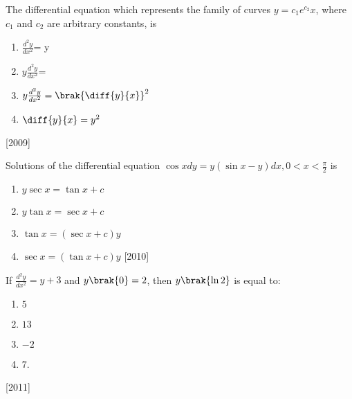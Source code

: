 \item The differential equation which represents the family of curves $y= c{_1}e^{c_2}x$, where $c{_1}$ and $c{_2}$ are arbitrary constants, is
\begin{multicols}{2}
 \begin{enumerate}
    \item $\frac{d^{2}y}{dx^{2}}$= y

    \item $y\frac{d^{2}y}{dx^{2}}$= 

    \item $y\frac{d^{2}y}{dx^{2}}=\brak{\diff{y}{x}}^2$
    
    \item $\diff{y}{x}=y^2$
 \end{enumerate}
\end{multicols}
\hfill
{[2009]}
\item Solutions of the differential equation $\cos{x} d{y}=y(\sin{x}-y)d{x},0<x<\frac{\pi}{2}$ is
\begin{multicols}{2}
 \begin{enumerate}
    
    \item $ y\sec{x}=\tan{x}+c$
    \item $y\tan{x}=\sec{x}+c$
    \item $\tan{x}=(\sec{x}+c)y$
    \item $\sec{x}=(\tan{x}+c)y$
\hfill
{{[2010]}}




    
 \end{enumerate}
\end{multicols}

\item If $\frac{d^{2}y}{dx^{2}}=y+3$ and $y\brak{0}=2$, then $y\brak{\ln{2}}$ is equal to:
\begin{multicols}{2}
 \begin{enumerate}
    \item $ 5 $
    \item $ 13 $
    \item $ -2 $
    \item $ 7 $.
 \end {enumerate}
\end{multicols}
\hfill
{{[2011]}}



